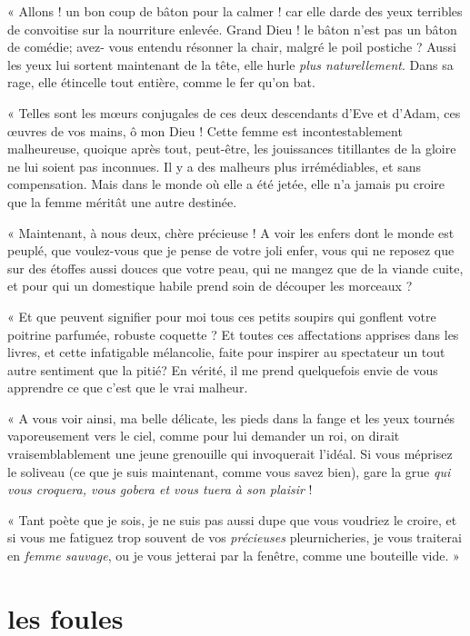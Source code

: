 « Allons ! un bon coup de bâton pour la calmer ! car elle darde des yeux
terribles de convoitise sur la nourriture enlevée. Grand Dieu ! le
bâton n’est pas un bâton de comédie; avez{}- vous
entendu résonner la chair, malgré le poil postiche ? Aussi les yeux lui
sortent maintenant de la tête, elle hurle \textit{plus naturellement}. Dans sa
rage, elle étincelle tout entière, comme le fer qu’on
bat.

« Telles sont les m\oe urs conjugales de ces deux descendants
d’Eve et d’Adam, ces \oe uvres de vos
mains, ô mon Dieu ! Cette femme est incontestablement malheureuse,
quoique après tout, peut{}-être, les jouissances titillantes de la
gloire ne lui soient pas inconnues. Il y a des malheurs plus
irrémédiables, et sans compensation. Mais dans le monde où elle a été
jetée, elle n’a jamais pu croire que la femme méritât
une autre destinée.

« Maintenant, à nous deux, chère précieuse ! A voir les enfers dont le 
monde est peuplé, que voulez{}-vous que je pense de votre joli enfer,
vous qui ne reposez que sur des étoffes aussi douces que votre peau,
qui ne mangez que de la viande cuite, et pour qui un domestique habile
prend soin de découper les morceaux ?

« Et que peuvent signifier pour moi tous ces petits soupirs qui gonflent
votre poitrine parfumée, robuste coquette ? Et toutes ces affectations
apprises dans les livres, et cette infatigable mélancolie, faite pour inspirer au spectateur un tout autre
sentiment que la pitié? En vérité, il me prend quelquefois envie de
vous apprendre ce que c’est que le vrai malheur.

« A vous voir ainsi, ma belle délicate, les pieds dans la fange et les
yeux tournés vaporeusement vers le ciel, comme pour lui demander un
roi, on dirait vraisemblablement une jeune grenouille qui invoquerait
l’idéal. Si vous méprisez le soliveau (ce que je suis
maintenant, comme vous savez bien), gare la grue \textit{qui vous croquera,
vous gobera et vous tuera à son plaisir} !

« Tant poète que je sois, je ne suis pas aussi dupe que vous voudriez le
croire, et si vous me fatiguez trop souvent de vos \textit{précieuses}
pleurnicheries, je vous traiterai en \textit{femme sauvage}, ou je vous jetterai
par la fenêtre, comme une bouteille vide. »

\quebra\section[Les foules]{les foules}

